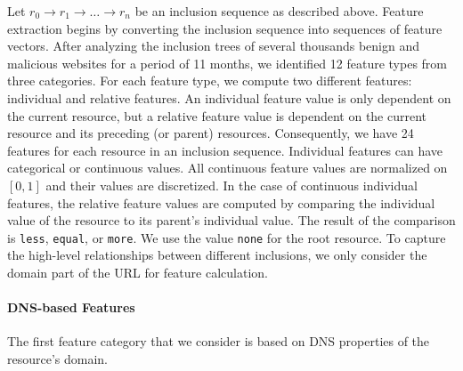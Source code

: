 Let $r_0 \rightarrow r_1 \rightarrow \dots \rightarrow r_n$ be an inclusion
sequence as described above. Feature extraction begins by converting the
inclusion sequence into sequences of feature vectors. After analyzing the
inclusion trees of several thousands benign and malicious websites for a period
of 11 months, we identified 12 feature types from three categories. For each
feature type, we compute two different features: individual and relative
features. An individual feature value is only dependent on the current resource,
but a relative feature value is dependent on the current resource and its
preceding (or parent) resources. Consequently, we have 24 features for each
resource in an inclusion sequence. Individual features can have categorical or
continuous values. All continuous feature values are normalized on
$\left[0,1\right]$ and their values are discretized. In the case of continuous
individual features, the relative feature values are computed by comparing the
individual value of the resource to its parent's individual value. The result of
the comparison is \texttt{less}, \texttt{equal}, or \texttt{more}. We use the
value \texttt{none} for the root resource. To capture the high-level
relationships between different inclusions, we only consider the domain part of
the URL for feature calculation.

\paragraph{DNS-based Features}

The first feature category that we consider is based on DNS properties of the
resource's domain.





